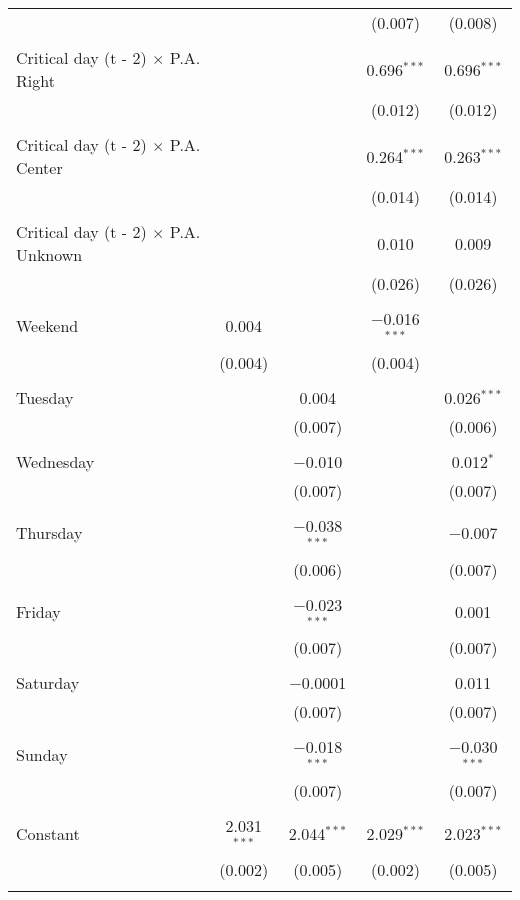 \documentclass[
]{article}
\begin{document}
\begin{table}[!htbp]
{\begin{tabular}{@{\extracolsep{5pt}}lcccc}
  &  &  & (0.007) & (0.008) \\ 
  & & & & \\ 
 Critical day (t - 2) $\times$ P.A. Right &  &  & 0.696$^{***}$ & 0.696$^{***}$ \\ 
  &  &  & (0.012) & (0.012) \\ 
  & & & & \\ 
 Critical day (t - 2) $\times$ P.A. Center &  &  & 0.264$^{***}$ & 0.263$^{***}$ \\ 
  &  &  & (0.014) & (0.014) \\ 
  & & & & \\ 
 Critical day (t - 2) $\times$ P.A. Unknown &  &  & 0.010 & 0.009 \\ 
  &  &  & (0.026) & (0.026) \\ 
  & & & & \\ 
 Weekend & 0.004 &  & $-$0.016$^{***}$ &  \\ 
  & (0.004) &  & (0.004) &  \\ 
  & & & & \\ 
 Tuesday &  & 0.004 &  & 0.026$^{***}$ \\ 
  &  & (0.007) &  & (0.006) \\ 
  & & & & \\ 
 Wednesday &  & $-$0.010 &  & 0.012$^{*}$ \\ 
  &  & (0.007) &  & (0.007) \\ 
  & & & & \\ 
 Thursday &  & $-$0.038$^{***}$ &  & $-$0.007 \\ 
  &  & (0.006) &  & (0.007) \\ 
  & & & & \\ 
 Friday &  & $-$0.023$^{***}$ &  & 0.001 \\ 
  &  & (0.007) &  & (0.007) \\ 
  & & & & \\ 
 Saturday &  & $-$0.0001 &  & 0.011 \\ 
  &  & (0.007) &  & (0.007) \\ 
  & & & & \\ 
 Sunday &  & $-$0.018$^{***}$ &  & $-$0.030$^{***}$ \\ 
  &  & (0.007) &  & (0.007) \\ 
  & & & & \\ 
 Constant & 2.031$^{***}$ & 2.044$^{***}$ & 2.029$^{***}$ & 2.023$^{***}$ \\ 
  & (0.002) & (0.005) & (0.002) & (0.005) \\ 
  & & & & \\ 

\end{tabular}}
\end{table}
\end{document}
